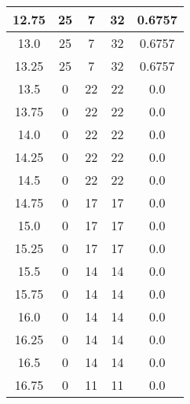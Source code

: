 \documentclass[letterpaper, 12pt]{article}
\begin{document}
\begin{longtable}{|c|c|c|c|c|}
\hline
12.75 & 25 & 7 & 32 & 0.6757 \\
\hline
13.0 & 25 & 7 & 32 & 0.6757 \\
\hline
13.25 & 25 & 7 & 32 & 0.6757 \\
\hline
13.5 & 0 & 22 & 22 & 0.0 \\
\hline
13.75 & 0 & 22 & 22 & 0.0 \\
\hline
14.0 & 0 & 22 & 22 & 0.0 \\
\hline
14.25 & 0 & 22 & 22 & 0.0 \\
\hline
14.5 & 0 & 22 & 22 & 0.0 \\
\hline
14.75 & 0 & 17 & 17 & 0.0 \\
\hline
15.0 & 0 & 17 & 17 & 0.0 \\
\hline
15.25 & 0 & 17 & 17 & 0.0 \\
\hline
15.5 & 0 & 14 & 14 & 0.0 \\
\hline
15.75 & 0 & 14 & 14 & 0.0 \\
\hline
16.0 & 0 & 14 & 14 & 0.0 \\
\hline
16.25 & 0 & 14 & 14 & 0.0 \\
\hline
16.5 & 0 & 14 & 14 & 0.0 \\
\hline
16.75 & 0 & 11 & 11 & 0.0 \\
\hline
\end{longtable}
\end{document}
